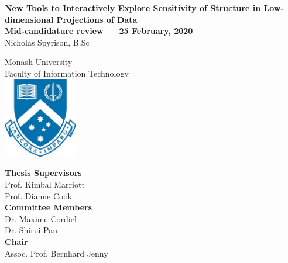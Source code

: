 \documentclass[11,]{article}
\title{}
\author{}
\date{}
\begin{document}

\onehalfspacing
{}

\begin{center}
\huge{\textbf{New Tools to Interactively Explore Sensitivity of Structure in Low-dimensional Projections of Data}}\\
\vspace*{1\baselineskip}
\Large{\textbf{Mid-candidature review --- 25 February, 2020}}\\
\LARGE{Nicholas Spyrison, B.Sc}\\
\vspace*{1\baselineskip}

\LARGE{Monash University}\\
\Large{Faculty of Information Technology}\\
\vspace*{1\baselineskip}
\includegraphics[height = 3.5cm]{./figures/crest.jpg}\\
\vspace*{1\baselineskip}

\Large{\textbf{Thesis Supervisors}}\\
Prof. Kimbal Marriott\\
Prof. Dianne Cook\\
\vspace*{1\baselineskip}
\Large{\textbf{Committee Members}}\\
Dr. Maxime Cordiel\\
Dr. Shirui Pan\\
\vspace*{1\baselineskip}
\Large{\textbf{Chair}}\\
Assoc. Prof. Bernhard Jenny\\
\end{center}

\doublespacing

\newpage
{}
\end{document}
